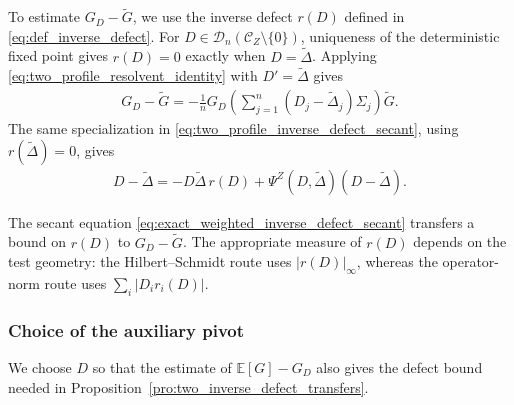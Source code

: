 \documentclass[EJP, preprint, NODS, nobera, nofontexpansion]{ejpecp}
\begin{document}
To estimate \(G_D-\widetilde G\), we use the inverse defect \(r(D)\)
defined in \eqref{eq:def_inverse_defect}. For
\(D\in\mathcal D_n(\mathcal C_Z\setminus\{0\})\), uniqueness of the
deterministic fixed point gives \(r(D)=0\) exactly when
\(D=\widetilde\Delta\). Applying
\eqref{eq:two_profile_resolvent_identity} with
\(D'=\widetilde\Delta\) gives
\begin{align}
    G_D-\widetilde G
    =
    -\frac1n
    G_D
    \left(
        \sum_{j=1}^n
        (D_j-\widetilde\Delta_j)\Sigma_j
    \right)
    \widetilde G.
\end{align}
The same specialization in \eqref{eq:two_profile_inverse_defect_secant},
using \(r(\widetilde\Delta)=0\), gives
\begin{align}
\label{eq:exact_weighted_inverse_defect_secant}
    D-\widetilde\Delta
    =
    -D\widetilde\Delta\,r(D)
    +
    \Psi^Z(D,\widetilde\Delta)
    (D-\widetilde\Delta).
\end{align}

The secant equation \eqref{eq:exact_weighted_inverse_defect_secant}
transfers a bound on \(r(D)\) to \(G_D-\widetilde G\).
The appropriate measure of \(r(D)\) depends
on the test geometry: the Hilbert--Schmidt route uses
\(|r(D)|_\infty\), whereas the operator-norm route uses
\(\sum_i|D_ir_i(D)|\).

\subsubsection{Choice of the auxiliary pivot}
\label{sse:universal_profile_pivots}

We choose \(D\) so that the estimate of \(\mathbb E[G]-G_D\) also
gives the defect bound needed in
Proposition~\ref{pro:two_inverse_defect_transfers}.
\end{document}
